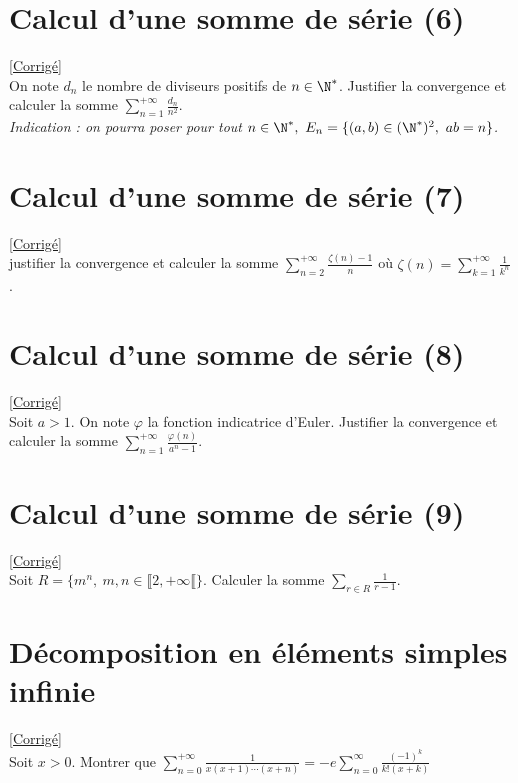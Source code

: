 \documentclass{book}
\begin{document}
	\section{Calcul d'une somme de série (6) }
	\label{Calcul d'une somme de série (6)}
	\textcolor{blue}{\hyperref[Calcul d'une somme de série (6) corrigé]{[Corrigé]}}\\
	On note $d_n$ le nombre de diviseurs positifs de $n\in \N^*$. Justifier la convergence et calculer la somme $\displaystyle\sum_{n=1}^{+\infty}\frac{d_n}{n^2}$.\\
	\textit{Indication : on pourra poser pour tout $n\in \N^*,\ E_n=\{(a,b)\in (\N^*)^2,\ ab=n\}$.}
	
	\section{Calcul d'une somme de série (7) }
	\label{Calcul d'une somme de série (7)}
	\textcolor{blue}{\hyperref[Calcul d'une somme de série (7) corrigé]{[Corrigé]}}\\
	justifier la convergence et calculer la somme $\displaystyle\sum_{n=2}^{+\infty}\frac{\zeta(n)-1}{n}$ où $\zeta(n)=\displaystyle\sum_{k=1}^{+\infty}\frac{1}{k^n}$.
	
	\section{Calcul d'une somme de série (8) }
	\label{Calcul d'une somme de série (8)}
	\textcolor{blue}{\hyperref[Calcul d'une somme de série (8) corrigé]{[Corrigé]}}\\
	Soit $a>1$. On note $\varphi$ la fonction indicatrice d'Euler. Justifier la convergence et calculer la somme $\displaystyle\sum_{n=1}^{+\infty}\frac{\varphi(n)}{a^n-1}$.
	
	\section{Calcul d'une somme de série (9)}
	\label{Calcul d'une somme de série (9)}
	\textcolor{blue}{\hyperref[Calcul d'une somme de série (9) corrigé]{[Corrigé]}}\\
	Soit $R=\{m^n,\ m,n\in \llbracket 2,+\infty \llbracket\}$. Calculer la somme $\displaystyle\sum_{r\in R}\frac{1}{r-1}$.
	
	\section{Décomposition en éléments simples infinie}
	\label{Décomposition en éléments simples infinie}
	\textcolor{blue}{\hyperref[Décomposition en éléments simples infinie corrigé]{[Corrigé]}}\\
	Soit $x>0$. Montrer que $\displaystyle\sum_{n=0}^{+\infty}\frac{1}{x(x+1)\cdots(x+n)}=-e\sum_{n=0}^{\infty}\frac{(-1)^k}{k!(x+k)}$
	
\end{document}
